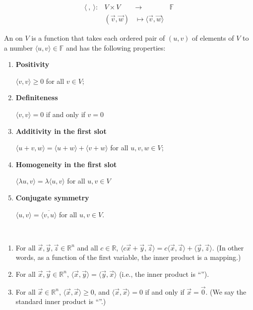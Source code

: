 \documentclass[11pt,fleqn]{book} %
\begin{document}
\setcounter{section}{0}
\setcounter{definitionT}{1}
\begin{definition}
    $$\begin{matrix} \langle~,~\rangle: &V \times V &\to &\mathbb{F} \\ &(\vec{v}, \vec{w}) &\mapsto \langle \vec{v}, \vec{w} \rangle \end{matrix}$$

    An  on $V$ is a function that takes each ordered pair of $(u, v)$ of elements of $V$ to a number $\langle u, v \rangle \in \mathbb{F}$ and has the following properties:

    \begin{enumerate}[label=\alph*)]
        \item \textbf{Positivity}

        $\langle v, v \rangle \ge 0$ for all $v \in V$;

        \item \textbf{Definiteness}

        $\langle v, v \rangle = 0$ if and only if $v = 0$

        \item \textbf{Additivity in the first slot}

        $\langle u + v, w \rangle = \langle u + w \rangle + \langle v + w \rangle$ for all $u, v, w \in V$;

        \item \textbf{Homogeneity in the first slot}

        $\langle \lambda u, v \rangle = \lambda\langle u, v\rangle$ for all $u, v \in V$

        \item \textbf{Conjugate symmetry}

        $\langle u, v \rangle = \overline{\langle v, u \rangle}$ for all $u, v \in V$.
    \end{enumerate}
\end{definition}
\setcounter{section}{3}

\setcounter{chapter}{4}
\setcounter{dummy}{1}
\begin{proposition}
{~~~}

    \begin{enumerate}[label=\alph*)]
        \item For all $\vec{x}, \vec{y}, \vec{z} \in \mathbb{R}^n$ and all $c \in \mathbb{R}$, $\langle c\vec{x} + \vec{y}, \vec{z} \rangle = c \langle \vec{x}, \vec{z} \rangle + \langle \vec{y}, \vec{z} \rangle$. (In other words, as a function of the first variable, the inner product is a  mapping.)
        \item For all $\vec{x}, \vec{y} \in \mathbb{R}^n$, $\langle \vec{x}, \vec{y} \rangle = \langle \vec{y}, \vec{x} \rangle$ (i.e., the inner product is ``'').
        \item For all $\vec{x} \in \mathbb{R}^n$, $\langle \vec{x}, \vec{x} \rangle \ge 0$, and $\langle \vec{x}, \vec{x} \rangle = 0$ if and only if $\vec{x} = \vec{0}$. (We say the standard inner product is ``''.)
    \end{enumerate}
\end{proposition}
\setcounter{chapter}{3}
\end{document}
